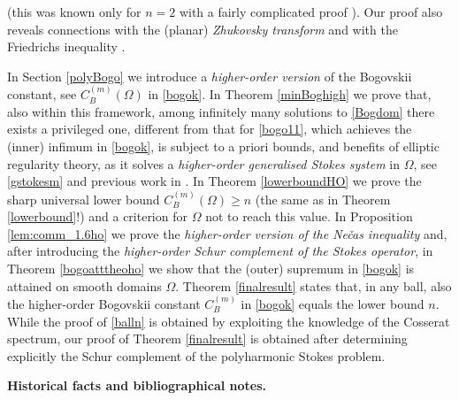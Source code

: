 \documentclass[11pt]{article}
\theoremstyle{plain}
\theoremstyle{definition}
\numberwithin{equation}{section}
\begin{document}
(this was known only for $n=2$ with a fairly complicated proof \cite{Chizhonkov_Olshanskii_2000}). Our proof also reveals connections with
the (planar) {\em Zhukovsky transform} \cite[Chapter 4]{acheson1990elementary} and with the Friedrichs inequality \cite{friedrichs1937certain}.\par
In Section \ref{polyBogo} we introduce a {\em higher-order version} of the Bogovskii constant, see $C_{B}^{(m)}(\Omega)$ in \eqref{bogok}.
In Theorem \ref{minBoghigh} we prove that, also within this framework, among infinitely many solutions to \eqref{Bogdom} there exists
a privileged one, different from that for \eqref{bogo11}, which achieves the (inner) infimum in \eqref{bogok}, is subject to a priori bounds,
and benefits of elliptic regularity theory, as it solves a \textit{higher-order generalised Stokes system} in $\Omega$, see \eqref{gstokesm} and previous work in \cite{amrouche1992problemes}. In Theorem \ref{lowerboundHO} we prove the sharp universal lower bound
$C_{B}^{(m)}(\Omega)\ge n$ (the same as in Theorem \ref{lowerbound}!) and a criterion for $\Omega$ not to reach this value.
In Proposition \ref{lem:comm_1.6ho} we prove the {\em higher-order version of the Ne\v{c}as inequality} and,
after introducing the \textit{higher-order Schur complement of the Stokes operator}, in Theorem \ref{bogoatttheoho} we show that the
(outer) supremum in \eqref{bogok} is attained on smooth domains $\Omega$. Theorem \ref{finalresult} states that, in any ball, also the higher-order
Bogovskii constant $C_{B}^{(m)}$ in \eqref{bogok} equals the lower bound $n$. While the proof of \eqref{balln} is obtained by exploiting the knowledge
of the Cosserat spectrum, our proof of Theorem \ref{finalresult} is obtained after determining explicitly the Schur complement of the polyharmonic Stokes problem.
\par\medskip\noindent
\textbf{Historical facts and bibliographical notes.}
\end{document}
